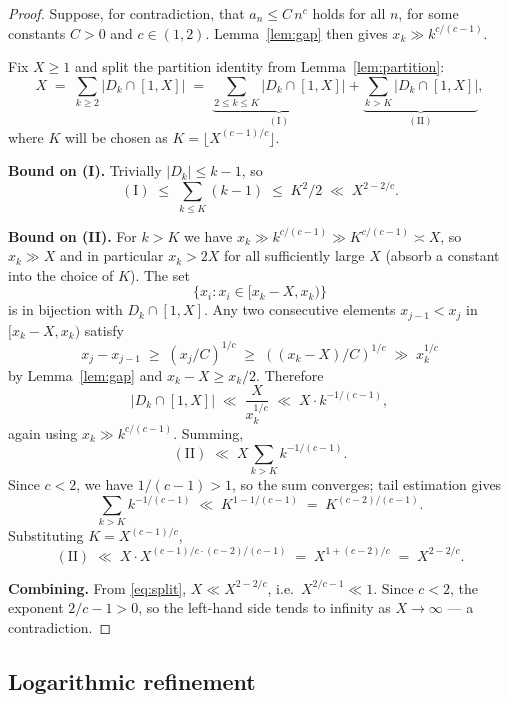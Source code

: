 \documentclass[11pt]{article}
\begin{document}
\begin{proof}
Suppose, for contradiction, that $a_n \leq C\, n^c$ holds for all $n$,
for some constants $C > 0$ and $c \in (1, 2)$.
Lemma~\ref{lem:gap} then gives $x_k \gg k^{c/(c-1)}$.

Fix $X \geq 1$ and split the partition identity from
Lemma~\ref{lem:partition}:
\begin{equation}\label{eq:split}
   X \;=\; \sum_{k \geq 2} |D_k \cap [1, X]|
       \;=\; \underbrace{\sum_{2 \leq k \leq K} |D_k \cap [1, X]|}_{(\mathrm{I})}
         + \underbrace{\sum_{k > K} |D_k \cap [1, X]|}_{(\mathrm{II})},
\end{equation}
where $K$ will be chosen as $K = \lfloor X^{(c-1)/c} \rfloor$.

\medskip
\noindent \textbf{Bound on (I).} Trivially $|D_k| \leq k - 1$, so
\[
   (\mathrm{I}) \;\leq\; \sum_{k \leq K} (k-1)
              \;\leq\; K^2 / 2 \;\ll\; X^{2 - 2/c}.
\]

\medskip
\noindent \textbf{Bound on (II).} For $k > K$ we have
$x_k \gg k^{c/(c-1)} \gg K^{c/(c-1)} \asymp X$, so $x_k \gg X$ and in
particular $x_k > 2X$ for all sufficiently large $X$ (absorb a constant
into the choice of $K$). The set
\[
   \{x_i : x_i \in [x_k - X, x_k)\}
\]
is in bijection with $D_k \cap [1, X]$. Any two consecutive elements
$x_{j-1} < x_j$ in $[x_k - X, x_k)$ satisfy
\[
   x_j - x_{j-1} \;\geq\; (x_j/C)^{1/c}
                 \;\geq\; ((x_k - X)/C)^{1/c}
                 \;\gg\; x_k^{1/c}
\]
by Lemma~\ref{lem:gap} and $x_k - X \geq x_k/2$. Therefore
\[
   |D_k \cap [1, X]| \;\ll\; \frac{X}{x_k^{1/c}}
                       \;\ll\; X \cdot k^{-1/(c-1)},
\]
again using $x_k \gg k^{c/(c-1)}$. Summing,
\[
   (\mathrm{II}) \;\ll\; X \sum_{k > K} k^{-1/(c-1)}.
\]
Since $c < 2$, we have $1/(c-1) > 1$, so the sum converges; tail
estimation gives
\[
   \sum_{k > K} k^{-1/(c-1)} \;\ll\; K^{1 - 1/(c-1)}
                              \;=\; K^{(c-2)/(c-1)}.
\]
Substituting $K = X^{(c-1)/c}$,
\[
   (\mathrm{II}) \;\ll\; X \cdot X^{(c-1)/c \cdot (c-2)/(c-1)}
                  \;=\; X^{1 + (c-2)/c}
                  \;=\; X^{2 - 2/c}.
\]

\medskip
\noindent \textbf{Combining.} From \eqref{eq:split},
$X \ll X^{2 - 2/c}$, i.e.\
$X^{2/c - 1} \ll 1$. Since $c < 2$, the exponent $2/c - 1 > 0$, so the
left-hand side tends to infinity as $X \to \infty$ --- a contradiction.
\end{proof}

\subsection{Logarithmic refinement}
\end{document}

